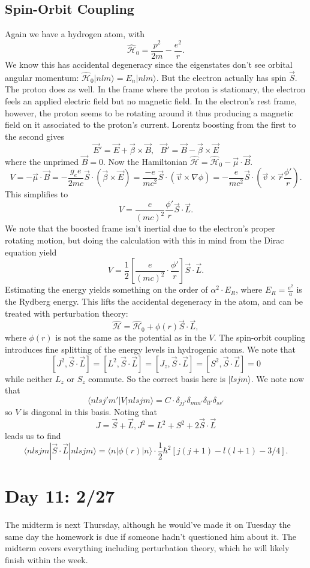 \documentclass[fontsize=12pt]{scrartcl}
\newcommand{\la}{\langle}
\newcommand{\ra}{\rangle}
\newcommand{\Ham}{\hat{\mathcal{H}}}
\begin{document}
\subsection{Spin-Orbit Coupling}

Again we have a hydrogen atom, with $$\Ham_0=\frac{p^2}{2m}-\frac{e^2}{r}.$$ We know this has accidental degeneracy since the eigenstates don't see orbital angular momentum: $\Ham_0|nlm\ra = E_n|nlm\ra$. But the electron actually has spin $\vec{S}$. The proton does as well. In the frame where the proton is stationary, the electron feels an applied electric field but no magnetic field. In the electron's rest frame, however, the proton seems to be rotating around it thus producing a magnetic field on it associated to the proton's current. Lorentz boosting from the first to the second gives $$\vec{E}'=\vec{E}+\vec{\beta}\times\vec{B}, \ \ \ \vec{B}'=\vec{B}-\vec{\beta}\times\vec{E}$$ where the unprimed $\vec{B}=0$. Now the Hamiltonian $\Ham=\Ham_0-\vec{\mu}\cdot\vec{B}$. $$V=-\vec{\mu}\cdot\vec{B}=-\frac{g_ee}{2mc}\vec{S}\cdot(\vec{\beta}\times\vec{E})= \frac{-e}{mc^2}\vec{S}\cdot (\vec{v}\times \nabla\phi)=-\frac{e}{mc^2}\vec{S}\cdot(\vec{v}\times \vec{r}\frac{\phi'}{r}).$$ This simplifies to $$V=\frac{e}{(mc)^2}\frac{\phi'}{r}\vec{S}\cdot\vec{L}.$$ We note that the boosted frame isn't inertial due to the electron's proper rotating motion, but doing the calculation with this in mind from the Dirac equation yield $$V=\frac{1}{2}\left[\frac{e}{(mc)^2}\cdot\frac{\phi'}{r}\right]\vec{S}\cdot\vec{L}.$$ Estimating the energy yields something on the order of $\alpha^2\cdot E_R$, where $E_R=\frac{e^2}{a}$ is the Rydberg energy. This lifts the accidental degeneracy in the atom, and can be treated with perturbation theory: $$\Ham=\Ham_0+\phi(r)\vec{S}\cdot\vec{L},$$ where $\phi(r)$ is not the same as the potential as in the $V$. The spin-orbit coupling introduces fine splitting of the energy levels in hydrogenic atoms. We note that $$[J^2,\vec{S}\cdot\vec{L}]=[L^2,\vec{S}\cdot\vec{L}]=[J_z,\vec{S}\cdot\vec{L}]=[S^2,\vec{S}\cdot\vec{L}]=0$$ while neither $L_z$ or $S_z$ commute. So the correct basis here is $|lsjm\ra$. We note now that $$\la n l s j'm'|V|nlsjm\ra = C\cdot\delta_{jj'}\delta_{mm'}\delta_{ll'}\delta_{ss'}$$ so $V$ is diagonal in this basis. Noting that $$J=\vec{S}+\vec{L}, J^2=L^2+S^2+2\vec{S}\cdot\vec{L}$$ leads us to find $$\la nlsjm|\vec{S}\cdot\vec{L}|nlsjm\ra = \la n|\phi(r)|n\ra\cdot\frac{1}{2}\hbar^2[j(j+1)-l(l+1)-3/4].$$


\section{Day 11: 2/27}
The midterm is next Thursday, although he would've made it on Tuesday the same day the homework is due if someone hadn't questioned him about it. The midterm covers everything including perturbation theory, which he will likely finish within the week.
\end{document}
